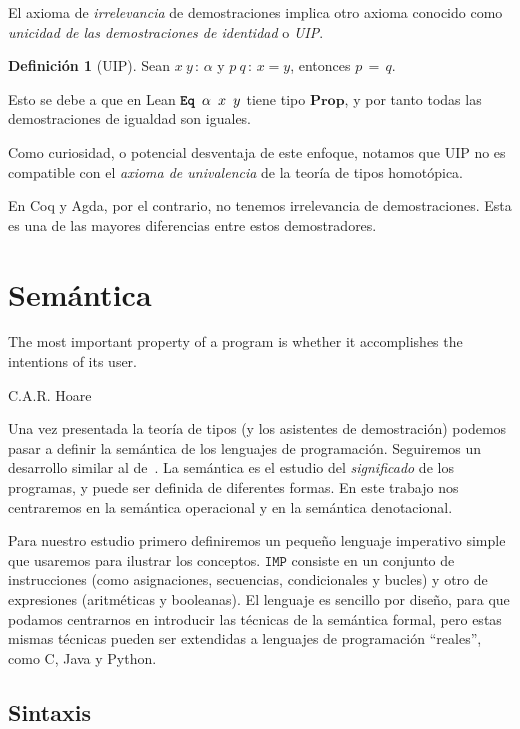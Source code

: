 \documentclass[
  a4paper, 
  10pt, 
  parskip=half, 
  toc=bibliography,
]{scrbook}
\theoremstyle{definition}
\theoremstyle{bolddef}
\newtheorem{definition}[theorem]{Definición}
\newcommand{\tyfont}[1]{\texttt{\textbf{#1}}}
\newcommand{\Prop}{\mathbf{Prop}}
\newcommand{\ImpName}{\texttt{IMP}}
\begin{document}
El axioma de \emph{irrelevancia} de demostraciones implica otro axioma conocido
como \emph{unicidad de las demostraciones de identidad} o \emph{UIP}.
\begin{definition}[UIP]
  Sean \(x \ y\, : \,\alpha\) y \(p \ q\, : \,x = y\), entonces \(p \,=\, q\).
\end{definition}
Esto se debe a que en Lean \(\tyfont{Eq} \, \ \alpha \, \ x \, \ y\) tiene tipo \(\Prop\), y
por tanto todas las demostraciones de igualdad son iguales.

Como curiosidad, o potencial desventaja de este enfoque, notamos que UIP no es
compatible con el \emph{axioma de univalencia} de la teoría de tipos homotópica.

En Coq y Agda, por el contrario, no tenemos irrelevancia de demostraciones.
Esta es una de las mayores diferencias entre estos demostradores.

\chapter{Semántica}
\epigraph{The most important property of a program is whether it accomplishes the intentions of its user.}{C.A.R. Hoare}

Una vez presentada la teoría de tipos (y los asistentes de demostración) podemos 
pasar a definir la semántica de los lenguajes de programación. Seguiremos un desarrollo
similar al de~\cite{winskel_formal_semantics}. La semántica es el estudio del
\emph{significado} de los programas, y puede ser definida de diferentes formas.
En este trabajo nos centraremos en la semántica operacional y en la semántica
denotacional.

Para nuestro estudio primero definiremos un pequeño lenguaje imperativo
simple que usaremos para ilustrar los conceptos. \(\ImpName\) 
consiste en un conjunto de instrucciones (como asignaciones, secuencias,
condicionales y bucles) y otro de expresiones (aritméticas y booleanas). El lenguaje es
sencillo por diseño, para que podamos centrarnos en introducir las técnicas de
la semántica formal, pero estas mismas técnicas pueden ser extendidas a lenguajes
de programación \enquote{reales}, como C, Java y Python.

\section{Sintaxis}
\end{document}
